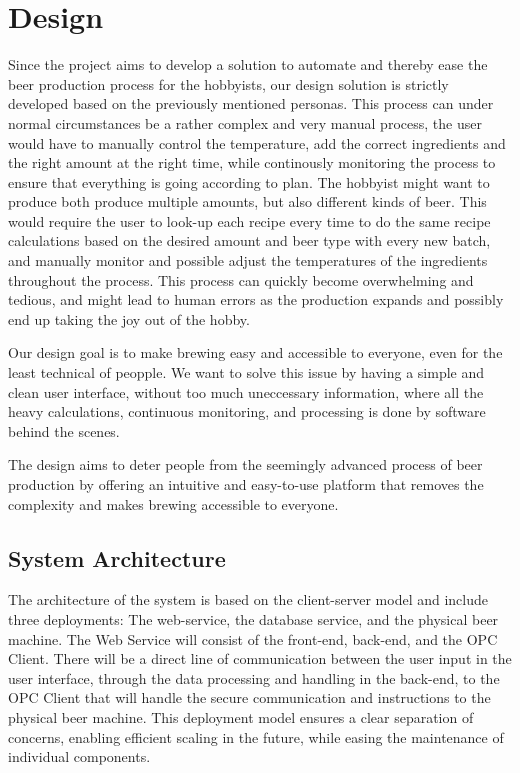 \section{Design}
Since the project aims to develop a solution to automate and thereby ease the beer production process for the hobbyists, our design solution is strictly developed based on the previously mentioned personas.
This process can under normal circumstances be a rather complex and very manual process, the user would have to manually control the temperature, add the correct ingredients and the right amount at the right time, while continously monitoring the process to ensure that everything is going according to plan.
The hobbyist might want to produce both produce multiple amounts, but also different kinds of beer. This would require the user to look-up each recipe every time to do the same recipe calculations based on the desired amount and beer type with every new batch, and manually monitor and possible adjust the temperatures of the ingredients throughout the process.
This process can quickly become overwhelming and tedious, and might lead to human errors as the production expands and possibly end up taking the joy out of the hobby.

Our design goal is to make brewing easy and accessible to everyone, even for the least technical of peopple. We want to solve this issue by having a simple and clean user interface, without too much uneccessary information, where all the heavy calculations, continuous monitoring, and processing is done by software behind the scenes.
 
The design aims to deter people from the seemingly advanced process of beer production by offering an intuitive and easy-to-use platform that removes the complexity and makes brewing accessible to everyone.

\subsection{System Architecture}
The architecture of the system is based on the client-server model and include three deployments: The web-service, the database service, and the physical beer machine. 
The Web Service will consist of the front-end, back-end, and the OPC Client. There will be a direct line of communication between the user input in the user interface, through the data processing and handling in the back-end, to the OPC Client that will handle the secure communication and instructions to the physical beer machine.
This deployment model ensures a clear separation of concerns, enabling efficient scaling in the future, while easing the maintenance of individual components.

